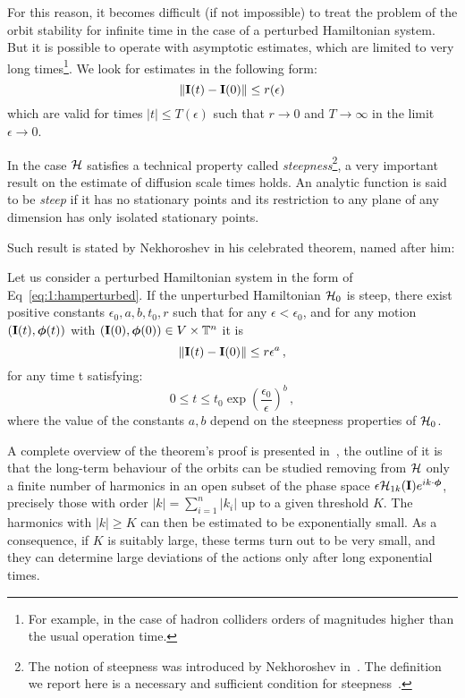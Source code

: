 For this reason, it becomes difficult (if not impossible) to treat the problem of the orbit stability for infinite time in the case of a perturbed Hamiltonian system. But it is possible to operate with asymptotic estimates, which are limited to very long times\footnote{For example, in the case of hadron colliders orders of magnitudes higher than the usual operation time.}. We look for estimates in the following form:
\begin{equation}
    \norm{\vb{I}(t)-\vb{I}(0)} \leq r(\epsilon)
\end{equation}
which are valid for times $|t| \leq T(\epsilon)$ such that $r \rightarrow 0$ and $T \rightarrow \infty$ in the limit $\epsilon \rightarrow 0$. 

In the case $\mathcal{H}$ satisfies a technical property called \textit{steepness}\footnote{The notion of steepness was introduced by Nekhoroshev in~\cite{N_N_Nehorošev_1973}. The definition we report here is a necessary and sufficient condition for steepness~\cite{AIF_2006__56_3_795_0}.}, a very important result on the estimate of diffusion scale times holds. An analytic function is said to be \textit{steep} if it has no stationary points and its restriction to any plane of any dimension has only isolated stationary points.

Such result is stated by Nekhoroshev in his celebrated theorem, named after him:
\begin{theorem}
    Let us consider a perturbed Hamiltonian system in the form of Eq~\eqref{eq:1:hamperturbed}. If the unperturbed Hamiltonian $\mathcal{H}_0$ is steep, there exist positive constants $\epsilon_0, a, b, t_0, r$ such that for any $\epsilon<\epsilon_0$, and for any motion $(\vb{I}(t), \boldsymbol{\phi}(t))$ with $(\vb{I}(0), \boldsymbol{\phi}(0)) \in V \times \mathbb{T}^n$ it is
    \begin{equation}
        \norm{\vb{I}(t)-\vb{I}(0)} \leq r \epsilon^a \,,
    \end{equation}
    for any time t satisfying:
    \begin{equation}
        0 \leq t \leq t_0 \exp \left(\frac{\epsilon_0}{\epsilon}\right)^b \,,  
    \end{equation}
    where the value of the constants $a, b$ depend on the steepness properties of $\mathcal{H}_0$.
\end{theorem}

A complete overview of the theorem's proof is presented in~\cite{Guzzo2007}, the outline of it is that the long-term behaviour of the orbits can be studied removing from $\mathcal{H}$ only a finite number of harmonics in an open subset of the phase space $\epsilon \mathcal{H}_{1k}(\vb{I}) e^{i k \cdot \boldsymbol{\phi}}$, precisely those with order $|k|=\sum_{i=1}^n\left|k_i\right|$ up to a given threshold $K$. The harmonics with $|k| \geq K$ can then be estimated to be exponentially small. As a consequence, if $K$ is suitably large, these terms turn out to be very small, and they can determine large deviations of the actions only after long exponential times.


